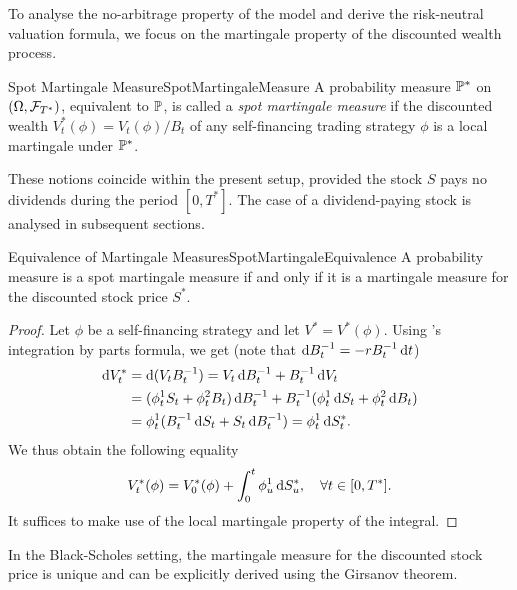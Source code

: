 To analyse the no-arbitrage property of the model and derive the risk-neutral valuation formula, we focus on the martingale property of the discounted wealth process.

\begin{defn}{Spot Martingale Measure}{SpotMartingaleMeasure}
	A probability measure \(\mathbb{P}^*\) on \((\Omega, \mathcal{F}_{T^*})\), equivalent to \(\mathbb{P}\), is called a \textit{spot martingale measure} if the discounted wealth \(V^*_t(\phi) = V_t(\phi)/B_t\) of any self-financing trading strategy \(\phi\) is a local martingale under \(\mathbb{P}^*\).
\end{defn}

These notions coincide within the present setup, provided the stock \(S\) pays no dividends during the period \([0, T^*]\). The case of a dividend-paying stock is analysed in subsequent sections.

\begin{lem}{Equivalence of Martingale Measures}{SpotMartingaleEquivalence}
	A probability measure is a spot martingale measure if and only if it is a martingale measure for the discounted stock price \(S^*\).
\end{lem}

\begin{proof}
	Let \(\phi\) be a self-financing strategy and let \(V^* = V^*(\phi)\). Using \Ito's integration by parts formula, we get (note that \(\mathrm{d} B_t^{-1} = -r B_t^{-1} \, \mathrm{d} t\))
	\begin{equation*}
		\begin{aligned}
			\mathrm{d} V^*_t & = \mathrm{d}(V_t B_t^{-1}) = V_t \, \mathrm{d} B_t^{-1} + B_t^{-1} \, \mathrm{d} V_t                                        \\
			          & = (\phi^1_t S_t + \phi^2_t B_t) \, \mathrm{d} B_t^{-1} + B_t^{-1} (\phi^1_t \, \mathrm{d} S_t + \phi^2_t \, \mathrm{d} B_t) \\
			          & = \phi^1_t (B_t^{-1} \, \mathrm{d} S_t + S_t \, \mathrm{d} B_t^{-1}) = \phi^1_t \, \mathrm{d} S^*_t.
		\end{aligned}
	\end{equation*}
	We thus obtain the following equality
	\begin{equation*}
		V^*_t(\phi) = V^*_0(\phi) + \int_0^t \phi^1_u \, \mathrm{d} S^*_u, \quad \forall t \in [0, T^*].
	\end{equation*}
	It suffices to make use of the local martingale property of the \Ito{} integral.
\end{proof}

In the Black-Scholes setting, the martingale measure for the discounted stock price is unique and can be explicitly derived using the Girsanov theorem.

